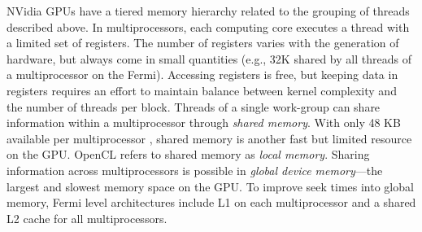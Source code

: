 \documentclass{report}
\begin{document}

NVidia GPUs have a tiered memory hierarchy related to the grouping of threads described above. 
In multiprocessors, each computing core executes a thread with a limited set of registers. The number of registers varies with the generation of hardware, but always come in small quantities (e.g., 32K shared by all threads of a multiprocessor on the Fermi). Accessing registers is free, but keeping data in registers requires an effort to maintain balance between kernel complexity and the number of threads per block. Threads of a single work-group can share information within a multiprocessor through \textit{shared memory}. With only 48 KB 
available per 
multiprocessor \cite{CudaGuide2011}, shared memory is another fast but limited resource on the GPU. OpenCL refers to shared memory as \textit{local memory}. 
Sharing information across multiprocessors is possible in \textit{global device memory}---the largest and slowest memory space on the GPU. To improve seek times into global memory, Fermi level architectures include L1 on each multiprocessor and a shared L2 cache for all multiprocessors.




%
\end{document}
